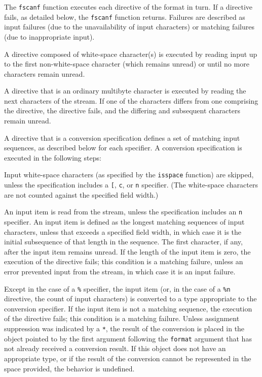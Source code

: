 The \texttt{fscanf} function executes each directive of the format in turn. If
a directive fails, as detailed below, the \texttt{fscanf} function returns.
Failures are described as input failures (due to the unavailability of input
characters) or matching failures (due to inappropriate input).

A directive composed of white-space character(s) is executed by reading input
up to the first non-white-space character (which remains unread) or until no
more characters remain unread.

A directive that is an ordinary multibyte character is executed by reading the
next characters of the stream. If one of the characters differs from one
comprising the directive, the directive fails, and the differing and subsequent
characters remain unread.

A directive that is a conversion specification defines a set of matching input
sequences, as described below for each specifier. A conversion specification is
executed in the following steps:

Input white-space characters (as specified by the \texttt{isspace} function)
are skipped, unless the specification includes a \texttt{[}, \texttt{c}, or
\texttt{n} specifier. (The white-space characters are not counted against the
specified field width.)

An input item is read from the stream, unless the specification includes an
\texttt{n} specifier. An input item is defined as the longest matching
sequences of input characters, unless that exceeds a specified field width, in
which case it is the initial subsequence of that length in the sequence. The
first character, if any, after the input item remains unread. If the length of
the input item is zero, the execution of the directive fails; this condition is
a matching failure, unless an error prevented input from the stream, in which
case it is an input failure.

Except in the case of a \texttt{\%} specifier, the input item (or, in the case
of a \texttt{\%n} directive, the count of input characters) is converted to a
type appropriate to the conversion specifier. If the input item is not a
matching sequence, the execution of the directive fails; this condition is a
matching failure. Unless assignment suppression was indicated by a \texttt{*},
the result of the conversion is placed in the object pointed to by the first
argument following the \texttt{format} argument that has not already received a
conversion result. If this object does not have an appropriate type, or if the
result of the conversion cannot be represented in the space provided, the
behavior is undefined.

